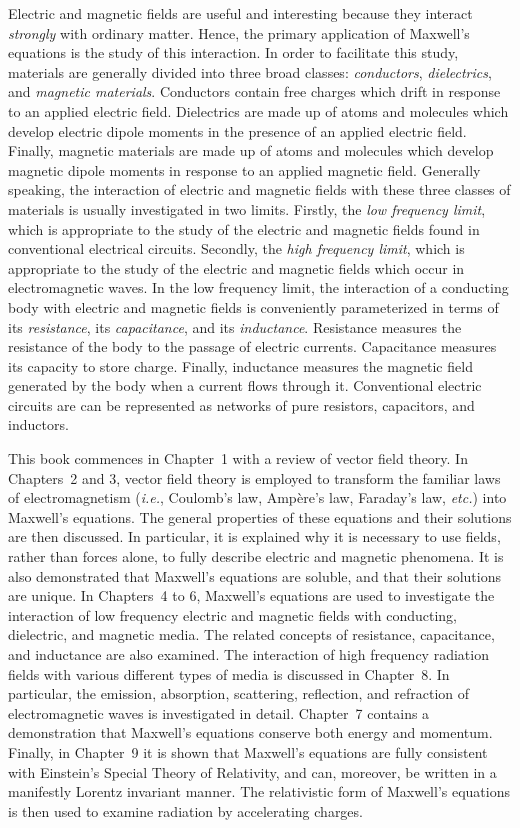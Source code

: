 Electric and magnetic fields are  useful and interesting  because they interact {\em strongly}\/  with ordinary matter.
Hence,
the primary application of Maxwell's equations is the study of this interaction.
In order to facilitate this study, materials are generally divided into three
broad classes: {\em conductors}, {\em dielectrics}, and {\em magnetic materials}. Conductors contain free charges which drift in response to
an applied electric field. Dielectrics are made up of atoms and molecules which
develop electric dipole moments in the presence of an applied electric field.
Finally, magnetic materials are made up of atoms and molecules which develop
magnetic dipole moments in response to an applied magnetic field.
Generally speaking, the interaction of electric and magnetic fields with these three classes
of materials is usually investigated in two limits. Firstly, the {\em low frequency limit}, which
is appropriate to the study of the electric and magnetic fields found in conventional electrical circuits. Secondly, the {\em high frequency limit},  which is appropriate to the
study of the electric and magnetic fields which occur in electromagnetic waves.
In the low frequency  limit, the interaction of  a conducting body with electric and magnetic fields  is conveniently parameterized in terms of its {\em resistance}, its {\em capacitance}, and its {\em inductance}. Resistance measures the resistance
of the body to the passage of electric currents. Capacitance measures its
capacity to store charge. Finally, inductance measures the magnetic
field generated by the body when a current flows through it. Conventional
electric circuits are can be  represented as networks of pure resistors, capacitors, and inductors.

This book commences in Chapter~1 with a review of vector field theory. In
Chapters~2 and 3, vector field theory is employed to transform the
familiar laws of electromagnetism ({\em i.e.}, Coulomb's law, Amp\`{e}re's law, Faraday's
law, {\em etc.}) into Maxwell's equations. The general properties of these
equations and their solutions are then discussed. In particular, it is explained why it is necessary to use fields, rather than forces alone, to fully describe electric and magnetic phenomena. It is also demonstrated that Maxwell's equations are
soluble, and that their solutions are unique.
In Chapters~4 to 6, Maxwell's equations are  used to investigate the interaction
of low frequency electric and magnetic fields with conducting, dielectric, and
magnetic media. The related concepts of resistance, capacitance, and inductance are also examined. The interaction of high frequency radiation fields with various different types of media is
discussed  in Chapter~8. In particular, the emission, absorption, scattering, reflection, and refraction of electromagnetic waves is investigated in detail.
Chapter~7 contains a demonstration that Maxwell's equations
conserve both energy and momentum. Finally, in Chapter~9 it is shown that
Maxwell's equations are fully consistent with Einstein's Special Theory
of Relativity, and can, moreover,  be written in a manifestly Lorentz invariant manner. The relativistic form of Maxwell's equations is then used to examine
radiation by accelerating charges.

